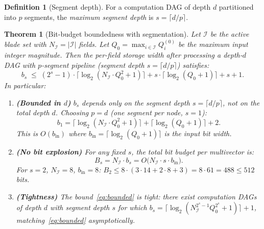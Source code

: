 \documentclass[11pt,a4paper]{article}
\theoremstyle{definition}
\newtheorem{definition}{Definition}[section]
\theoremstyle{plain}
\newtheorem{theorem}{Theorem}[section]
\theoremstyle{remark}
\begin{document}
\begin{definition}[Segment depth]
For a computation DAG of depth $d$ partitioned into $p$ segments,
the \emph{maximum segment depth} is $s=\lceil d/p\rceil$.
\end{definition}

\begin{theorem}[Bit-budget boundedness with segmentation]
\label{thm:bounded}
Let $\mathcal{I}$ be the active blade set with $N_\mathcal{I}=|\mathcal{I}|$
fields.
Let $Q_0 = \max_{i\in\mathcal{I}} Q_i^{(0)}$ be the maximum input
integer magnitude.
Then the per-field storage width after processing a depth-$d$ DAG
with $p$-segment pipeline (segment depth $s=\lceil d/p\rceil$) satisfies:
\begin{equation}\label{eq:bounded}
  b_s \;\le\; (2^s - 1)\cdot \lceil\log_2(N_\mathcal{I}\cdot Q_0^2+1)\rceil
          + s\cdot\lceil\log_2(Q_0+1)\rceil + s + 1.
\end{equation}
In particular:
\begin{enumerate}
  \item \textbf{(Bounded in $d$)}
        $b_s$ depends only on the segment depth $s = \lceil d/p\rceil$,
        not on the total depth $d$.
        Choosing $p=d$ (one segment per node, $s=1$):
        \begin{equation}\label{eq:s1}
          b_1 = \lceil\log_2(N_\mathcal{I}\cdot Q_0^2+1)\rceil + \lceil\log_2(Q_0+1)\rceil + 2.
        \end{equation}
        This is $O(b_{\text{in}})$ where $b_{\text{in}}=\lceil\log_2(Q_0+1)\rceil$
        is the input bit width.
  \item \textbf{(No bit explosion)}
        For any fixed $s$, the total bit budget per multivector is:
        \begin{equation}\label{eq:total-budget}
          B_s = N_\mathcal{I}\cdot b_s = O\!\bigl(N_\mathcal{I}\cdot s\cdot b_{\text{in}}\bigr).
        \end{equation}
        For $s=2$, $N_\mathcal{I}=8$, $b_{\text{in}}=8$: $B_2\le 8\cdot(3\cdot 14+2\cdot 8+3)=8\cdot 61=488\le 512$ bits.
  \item \textbf{(Tightness)}
        The bound~\eqref{eq:bounded} is tight: there exist computation
        DAGs of depth $d$ with segment depth $s$ for which
        $b_s = \lceil\log_2(N_\mathcal{I}^{2^s-1}Q_0^{2^s}+1)\rceil+1$,
        matching~\eqref{eq:bounded} asymptotically.
\end{enumerate}
\end{theorem}
\end{document}
